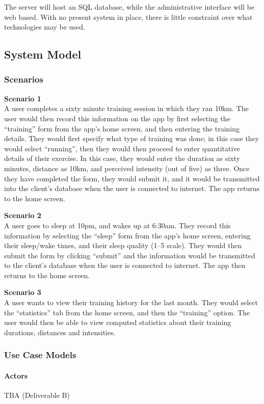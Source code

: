 \documentclass[a4paper, 11pt, titlepage]{article}
\begin{document}
The server will host an SQL database, while the administrative interface will be web based. With no present system in place, there is little constraint over what technologies may be used.

\subsection{System Model}
\subsubsection{Scenarios}
\textbf{Scenario 1}\\[0pt]
A user completes a sixty minute training session in which they ran 10km. The user would then record this information on the app by first selecting the “training” form from the app’s home screen, and then entering the training details. They would first specify what type of training was done; in this case they would select “running”, then they would then proceed to enter quantitative details of their exercise. In this case, they would enter the duration as sixty minutes, distance as 10km, and perceived intensity (out of five) as three. Once they have completed the form, they would submit it, and it would be transmitted into the client’s database when the user is connected to internet. The app returns to the home screen.

\textbf{Scenario 2}\\[0pt]
A user goes to sleep at 10pm, and wakes up at 6:30am. They record this information by selecting the “sleep” form from the app’s home screen, entering their sleep/wake times, and their sleep quality (1--5 scale).  They would then submit the form by clicking “submit” and the information would be transmitted to the client’s database when the user is connected to internet. The app then returns to the home screen.

\textbf{Scenario 3}\\[0pt]
A user wants to view their training history for the last month. They would select the “statistics” tab from the home screen, and then the “training” option. The user would then be able to view computed statistics about their training durations, distances and intensities.


\subsubsection{Use Case Models}
\paragraph{Actors}
TBA (Deliverable B)
\end{document}
